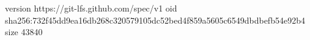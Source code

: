 version https://git-lfs.github.com/spec/v1
oid sha256:732f45dd9ea16db268c320579105dc52bed4f859a5605c6549dbdbefb54e92b4
size 43840
